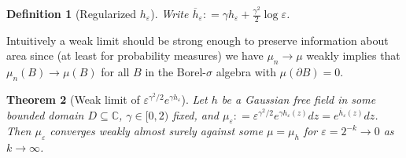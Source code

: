 \documentclass[11pt,reqno]{amsart}
\numberwithin{equation}{section}
\newtheorem{thm}{Theorem}[section]
\newtheorem{defi}[thm]{Definition}
\newcommand{\deq}{\mathrel{\mathop:}=}
\newcommand{\eps}{\varepsilon}
\begin{document}
\begin{defi}[Regularized $h_\eps$]
	Write $\overline h_\eps\deq \gamma h_\eps+\frac{\gamma^2}{2}\log\eps$.
\end{defi}


Intuitively a weak limit should be strong enough to preserve information about area since (at least for probability measures) we have $\mu_n\rightarrow\mu$ weakly implies that $\mu_n(B)\rightarrow\mu(B)$ for all $B$ in the Borel-$\sigma$ algebra with $\mu(\partial B)=0$.

\begin{thm}[Weak limit of $\eps^{\gamma^2/2}e^{\gamma h_\eps}$]\label{thm:weaklimitofmueps}
	Let $h$ be a Gaussian free field in some bounded domain $D\subseteq\mathbb C$, $\gamma \in [0,2)$ fixed, and $\mu_\eps\deq\eps^{\gamma^2/2}e^{\gamma h_\eps(z)}dz = e^{\overline h_\eps(z)}dz$. Then $\mu_\eps$ converges weakly almost surely against some $\mu=\mu_h$ for $\eps=2^{-k}\rightarrow 0$ as $k\rightarrow \infty$.
\end{thm}
\end{document}
